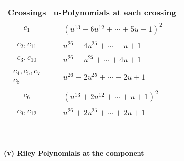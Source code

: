 \documentclass[1p]{elsarticle_modified}
\theoremstyle{definition}
\begin{document}
\begin{tabular}{m{50pt}|m{274pt}}
Crossings & \hspace{64pt}u-Polynomials at each crossing \\
\hline $$\begin{aligned}c_{1}\end{aligned}$$&$\begin{aligned}
&(u^{13}-6 u^{12}+\cdots+5 u-1)^{2}
\end{aligned}$\\
\hline $$\begin{aligned}c_{2},c_{11}\end{aligned}$$&$\begin{aligned}
&u^{26}-4 u^{25}+\cdots- u+1
\end{aligned}$\\
\hline $$\begin{aligned}c_{3},c_{10}\end{aligned}$$&$\begin{aligned}
&u^{26}- u^{25}+\cdots+4 u+1
\end{aligned}$\\
\hline $$\begin{aligned}c_{4},c_{5},c_{7}\\c_{8}\end{aligned}$$&$\begin{aligned}
&u^{26}-2 u^{25}+\cdots-2 u+1
\end{aligned}$\\
\hline $$\begin{aligned}c_{6}\end{aligned}$$&$\begin{aligned}
&(u^{13}+2 u^{12}+\cdots+u+1)^{2}
\end{aligned}$\\
\hline $$\begin{aligned}c_{9},c_{12}\end{aligned}$$&$\begin{aligned}
&u^{26}+2 u^{25}+\cdots+2 u+1
\end{aligned}$\\
\hline
\end{tabular}\\~\\
\newpage\renewcommand{\arraystretch}{1}
\flushleft \textbf{(v) Riley Polynomials at the component}\newline \\
\end{document}
